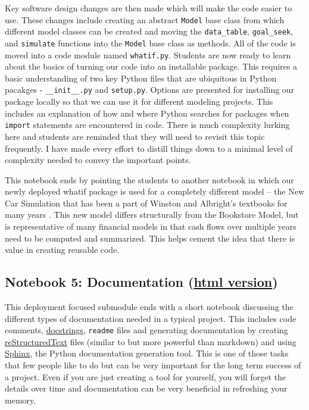 \documentclass[ited,blindrev]{informs3}              %
\newcommand{\code}[1]{\texttt{#1}}
\begin{document}
Key software design changes are then made which will make the code easier to use. These changes include creating an abstract \code{Model} base class from which different model classes can be created and moving the \code{data\_table}, \code{goal\_seek}, and \code{simulate} functions into the \code{Model} base class as methods. All of the code is moved into a code module named \code{whatif.py}. Students are now ready to learn about the basics of turning our code into an installable package. This requires a basic understanding of two key Python files that are ubiquitous in Python pacakges - \code{\_\_init\_\_.py} and \code{setup.py}. Options are presented for installing our package locally so that we can use it for different modeling projects. This includes an explanation of how and where Python searches for packages when \code{import} statements are encountered in code. There is much complexity lurking here and students are reminded that they will need to revisit this topic frequently. I have made every effort to distill things down to a minimal level of complexity needed to convey the important points.

This notebook ends by pointing the students to another notebook in which our newly deployed whatif package is used for a completely different model -- the New Car Simulation that has been a part of Winston and Albright's textbooks for many years \cite{winstonPracticalManagementScience2018,albrightBusinessAnalyticsData2016}. This new model differs structurally from the Bookstore Model, but is representative of many financial models in that cash flows over multiple years need to be computed and summarized. This helps cement the idea that there is value in creating reusable code.

\subsection{Notebook 5: Documentation (\href{http://www.sba.oakland.edu/faculty/isken/excel_with_python/what_if_5_documentation.html}{html version})}

This deployment focused submodule ends with a short notebook discussing the different types of documentation needed in a typical project. This includes code comments, \href{https://peps.python.org/pep-0257/}{docstrings}, \code{readme} files and generating documentation by creating \href{https://www.sphinx-doc.org/en/master/usage/restructuredtext/basics.html}{reStructuredText} files (similar to but more powerful than markdown) and using \href{https://www.sphinx-doc.org/en/master/index.html}{Sphinx}, the Python documentation generation tool. This is one of those tasks that few people like to do but can be very important for the long term success of a project. Even if you are just creating a tool for yourself, you will forget the details over time and documentation can be very beneficial in refreshing your memory. 
\end{document}
